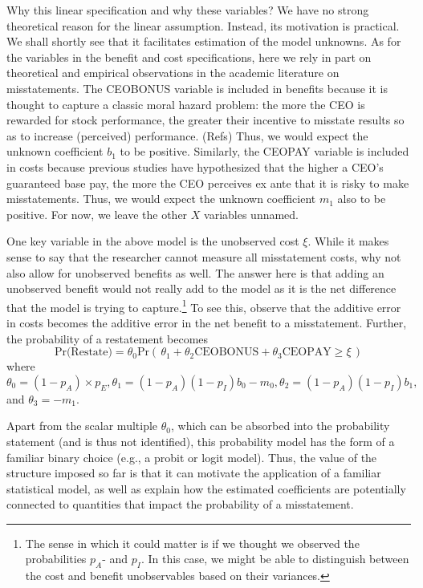 \documentclass[14pt]{article}
\begin{document}
Why this linear specification and why these variables? We have no strong theoretical
reason for the linear assumption. Instead, its motivation is practical. We shall shortly
see that it facilitates estimation of the model unknowns. As for the variables in the
benefit and cost specifications, here we rely in part on theoretical and empirical
observations in the academic literature on misstatements. The CEOBONUS variable 
is included in benefits because it is thought to capture a classic moral hazard
problem: the more the CEO is rewarded for stock performance, the
greater their incentive to misstate results so as to increase (perceived) 
performance. (Refs) Thus, we would expect the unknown coefficient $b_1$
to be positive. Similarly, the CEOPAY variable is included in costs because 
previous studies have hypothesized that the higher a CEO's guaranteed 
base pay, the more the CEO perceives ex ante that it is risky to make
misstatements.  Thus, we would expect the unknown coefficient $m_1$
also to be positive. For now, we leave the other $X$ variables unnamed.

One key variable in the above model is the unobserved cost $\xi$. While 
it makes sense to say that the researcher cannot measure all misstatement
costs, why not also allow for unobserved benefits as well. The answer here is
that adding an unobserved benefit would not really add to the model as it
is the net difference that the model is trying to capture.\footnote{The sense
in which it could matter is if we thought we observed the probabilities
$p_A$- and $p_I$. In this case, we might be able to distinguish between
the cost and benefit unobservables based on their variances.} To see this,
observe that the additive error in costs becomes the additive error in 
the net benefit to a misstatement. Further, the probability of a restatement
becomes
\begin{equation}\label{restate1}
\mbox{Pr(Restate)} = \theta_0 \mbox{Pr}\left(\, \theta_1 + \theta_2 \mbox{CEOBONUS}
+ \theta_3 \mbox{CEOPAY}  \ge \xi \,\right)
\end{equation}
where $\theta_0=(1-p_A) \times p_{E}, \theta_1 = (1 - p_A)(1 - p_I) b_0 - m_0, 
\theta_2 = (1 - p_A)(1 - p_I) b_1,$ and $\theta_3 = - m_1.$ 

Apart from the scalar multiple $\theta_0$, which can be absorbed into the probability
statement (and is thus not identified), this probability model has the form of 
a familiar binary choice (e.g., a probit or logit model). Thus, the value of the structure
imposed so far is that it can motivate the application of a familiar statistical model, as 
well as explain how the estimated coefficients are potentially connected to quantities
that impact the probability of a misstatement.
\end{document}
